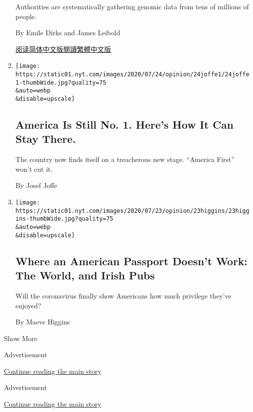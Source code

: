 \begin{enumerate}
  Authorities are systematically gathering genomic data from tens of
  millions of people.

  By Emile Dirks and James Leibold

  \href{https://cn.nytimes.com/opinion/20200728/china-dna-police/}{阅读简体中文版}\href{https://cn.nytimes.com/opinion/20200728/china-dna-police/zh-hant/}{閱讀繁體中文版}
\item
  \href{/2020/07/24/opinion/united-states-europe-china.html}{}

  \texttt{[image: https://static01.nyt.com/images/2020/07/24/opinion/24joffe1/24joffe1-thumbWide.jpg?quality=75\\\&auto=webp\\\&disable=upscale]}

  \hypertarget{america-is-still-no-1-heres-how-it-can-stay-there}{%
  \subsection{America Is Still No. 1. Here's How It Can Stay
  There.}\label{america-is-still-no-1-heres-how-it-can-stay-there}}

  The country now finds itself on a treacherous new stage. ``America
  First'' won't cut it.

  By Josef Joffe
\item
  \href{/2020/07/23/opinion/passport-coronavirus-travel.html}{}

  \texttt{[image: https://static01.nyt.com/images/2020/07/23/opinion/23higgins/23higgins-thumbWide.jpg?quality=75\\\&auto=webp\\\&disable=upscale]}

  \hypertarget{where-an-american-passport-doesnt-work-the-world-and-irish-pubs}{%
  \subsection{Where an American Passport Doesn't Work: The World, and
  Irish
  Pubs}\label{where-an-american-passport-doesnt-work-the-world-and-irish-pubs}}

  Will the coronavirus finally show Americans how much privilege they've
  enjoyed?

  By Maeve Higgins
\end{enumerate}

Show More

Advertisement

\protect\hyperlink{after-mid1}{Continue reading the main story}

Advertisement

\protect\hyperlink{after-mktg}{Continue reading the main story}

